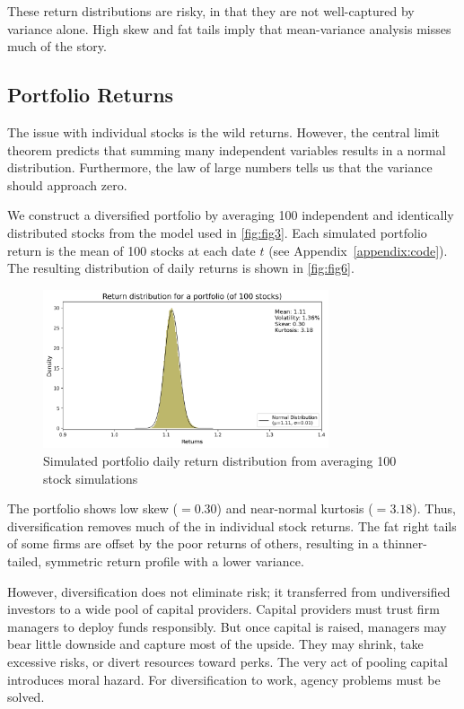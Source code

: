 These return distributions are risky, in that they are not well-captured by variance alone. High skew and fat tails imply that mean-variance analysis misses much of the story.

\subsection{Portfolio Returns}
The issue with individual stocks is the wild returns. However, the central limit theorem predicts that summing many independent variables results in a normal distribution. Furthermore, the law of large numbers tells us that the variance should approach zero.  

We construct a diversified portfolio by averaging 100 independent and identically distributed stocks from the model used in \autoref{fig:fig3}. Each simulated portfolio return is the mean of 100 stocks at each date $t$ (see Appendix~\ref{appendix:code}). The resulting distribution of daily returns is shown in \autoref{fig:fig6}.

\begin{figure}[h]
    \centering
    \includegraphics[width=0.75\textwidth]{fig6.png}
    \caption{Simulated portfolio daily return distribution from averaging 100 stock simulations}
    \label{fig:fig6}
\end{figure}

The portfolio shows low skew ($= 0.30$) and near-normal kurtosis ($= 3.18$). Thus, diversification removes much of the  in individual stock returns. The fat right tails of some firms are offset by the poor returns of others, resulting in a thinner-tailed, symmetric return profile with a lower variance.

However, diversification does not eliminate risk; it transferred from undiversified investors to a wide pool of capital providers. Capital providers must trust firm managers to deploy funds responsibly. But once capital is raised, managers may bear little downside and capture most of the upside. They may shrink, take excessive risks, or divert resources toward perks. The very act of pooling capital introduces moral hazard. For diversification to work, agency problems must be solved.